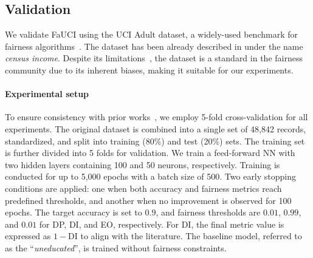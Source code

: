 \subsection{Validation}\label{subsec:validation-fauci}
%
We validate \gls{FaUCI} using the UCI Adult dataset, a widely-used benchmark for fairness algorithms~\cite{census_income_20}.
%
The dataset has been already described in  under the name \emph{census income}.
%
Despite its limitations~\cite{retiring-adult-2021}, the dataset is a standard in the fairness community due to its inherent biases, making it suitable for our experiments.

%
\paragraph{Experimental setup}
\label{par:experimental-setup}
%
To ensure consistency with prior works~\cite{DBLP:conf/ijcai/ManishaG20,DBLP:conf/aaaiss/WagnerG21}, we employ 5-fold cross-validation for all experiments.
%
The original dataset is combined into a single set of 48,842 records, standardized, and split into training (80\%) and test (20\%) sets.
%
The training set is further divided into 5 folds for validation.
%
We train a feed-forward \gls{NN} with two hidden layers containing 100 and 50 neurons, respectively.
%
Training is conducted for up to 5,000 epochs with a batch size of 500.
%
Two early stopping conditions are applied: one when both accuracy and fairness metrics reach predefined thresholds, and another when no improvement is observed for 100 epochs.
%
The target accuracy is set to \(0.9\), and fairness thresholds are \(0.01\), \(0.99\), and \(0.01\) for \gls{DP}, \gls{DI}, and \gls{EO}, respectively.
%
For \gls{DI}, the final metric value is expressed as \(1 - \text{DI}\) to align with the literature.
%
The baseline model, referred to as the ``\emph{uneducated}'', is trained without fairness constraints.

